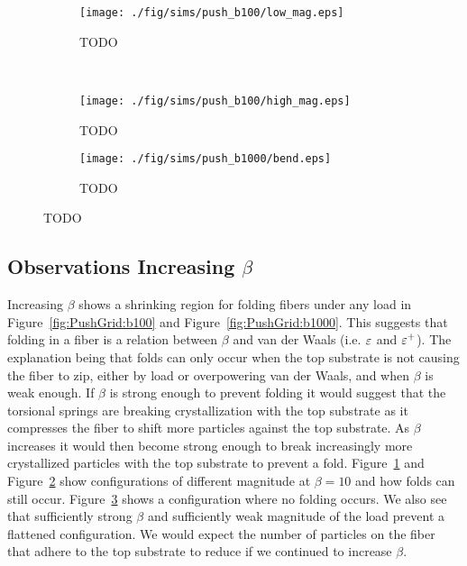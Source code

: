 	\begin{figure*}
		\centering
		\begin{subfigure}{.5\textwidth}
			\centering
			\texttt{[image: ./fig/sims/push\_b100/low\_mag.eps]}
			\caption{TODO \label{subfig:push_b100_low_mag}}
		\end{subfigure}%
		~
		\begin{subfigure}{.5\textwidth}
			\centering
			\texttt{[image: ./fig/sims/push\_b100/high\_mag.eps]}
			\caption{TODO \label{subfig:push_b100_high_mag}}
		\end{subfigure}

		\begin{subfigure}{.5\textwidth}
			\centering
			\texttt{[image: ./fig/sims/push\_b1000/bend.eps]}
			\caption{TODO \label{subfig:push_b1000_bend}}
		\end{subfigure}		
		\caption{TODO\label{fig:push_bending}}	
	\end{figure*}

\subsection{Observations Increasing $\beta$}

Increasing $\beta$ shows a shrinking region for folding fibers under any load in Figure~\ref{fig:PushGrid:b100} and Figure~\ref{fig:PushGrid:b1000}. This suggests that folding in a fiber is a relation between $\beta$ and van der Waals (i.e. $\varepsilon$ and $\varepsilon^+$). The explanation being that folds can only occur when the top substrate is not causing the fiber to zip, either by load or overpowering van der Waals, and when $\beta$ is weak enough. If $\beta$ is strong enough to prevent folding it would suggest that the torsional springs are breaking crystallization with the top substrate as it compresses the fiber to shift more particles against the top substrate. As $\beta$ increases it would then become strong enough to break increasingly more crystallized particles with the top substrate to prevent a fold. Figure~\ref{subfig:push_b100_low_mag} and Figure~\ref{subfig:push_b100_high_mag} show configurations of different magnitude at $\beta = 10$ and how folds can still occur. Figure~\ref{subfig:push_b1000_bend} shows a configuration where no folding occurs. We also see that sufficiently strong $\beta$ and sufficiently weak magnitude of the load prevent a flattened configuration. We would expect the number of particles on the fiber that adhere to the top substrate to reduce if we continued to increase $\beta$. 

